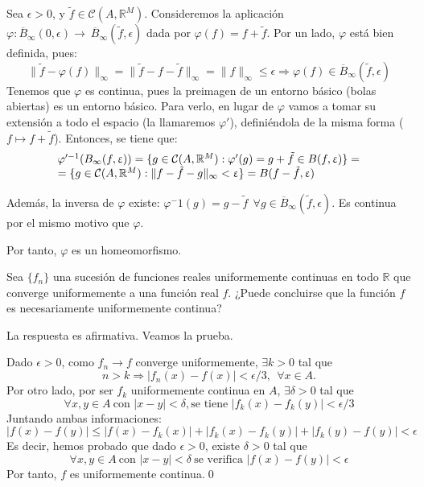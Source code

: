 \begin{sol}
    Sea $\epsilon > 0$, y $\tilde f \in \mathcal C (A, \mathbb{R}^M)$. Consideremos la aplicación $\varphi: \overline{B}_\infty(0,\epsilon) \to \ \overline{B}_\infty(\tilde f, \epsilon) $ dada por $\varphi(f) = f + \tilde f$.
    Por un lado, $\varphi$ está bien definida, pues: $$\|\tilde f - \varphi(f) \|_\infty= \| \tilde f - f - \tilde f \|_\infty = \|f\|_\infty \le \epsilon \Rightarrow \varphi(f) \in \overline{B}_\infty(\tilde f, \epsilon)$$
    Tenemos que $\varphi$ es continua, pues la preimagen de un entorno básico (bolas abiertas) es un entorno básico. Para verlo, en lugar de $\varphi$ vamos a tomar su extensión a todo el espacio (la llamaremos $\varphi'$), definiéndola de la misma forma ($f \mapsto f+\tilde f$). Entonces, se tiene que:
    \[
      \begin{array}{l}
	\varphi'^{-1}(B_\infty(f, \upvarepsilon)) = \{ g\in \mathcal{C}(A,\mathbb{R}^M) : \varphi'(g) = g + 	\tilde f \in B(f, \upvarepsilon)\} =\\
	= \{ g\in \mathcal{C}(A,\mathbb{R}^M) : \|f-\tilde f-g\|_\infty < \upvarepsilon\} = B(f-\tilde f,\upvarepsilon)
      \end{array}
    \]


    Además, la inversa de $\varphi$ existe: $\varphi^-1(g) = g - \tilde f\ \ \forall g \in \overline{B}_\infty(\tilde f, \epsilon)$. Es continua por el mismo motivo que $\varphi$.

    Por tanto, $\varphi$ es un homeomorfismo.
  \end{sol}


\begin{ejer}

  Sea $\{ f_n \}$ una sucesión de funciones reales uniformemente continuas en todo $\mathbb R$ que converge uniformemente a una función real $f$. ¿Puede concluirse que  la función $f$ es necesariamente uniformemente continua?
\end{ejer}

  \begin{sol}
    La respuesta es afirmativa. Veamos la prueba.

    Dado $\epsilon>0$, como $f_n \rightarrow f$ converge uniformemente, $\exists k>0$
    tal que $$n>k \Rightarrow |f_n(x)-f(x)| < \epsilon/3, \ \ \forall x \in A.$$
    Por otro lado, por ser $f_k$ uniformemente continua en $A$,
    $\exists \delta >0$ tal que $$\forall x,y \in A\ \textrm{con\ }|x-y| < \delta,\textrm{se\ tiene\ }|f_k(x)-f_k(y)| < \epsilon /3$$
    Juntando ambas informaciones: $$|f(x)-f(y)| \leq |f(x)-f_k(x)| + |f_k(x)-f_k(y)| + |f_k(y)-f(y)| < \epsilon$$
    Es decir, hemos probado que dado $\epsilon>0$, existe $\delta>0$ tal que $$\forall x,y \in A\ \textrm{con\ }|x-y|<\delta\ \textrm{se\ verifica\ }|f(x)-f(y)| < \epsilon$$
    Por tanto, $f$ es uniformemente continua.\qed
  \end{sol}


